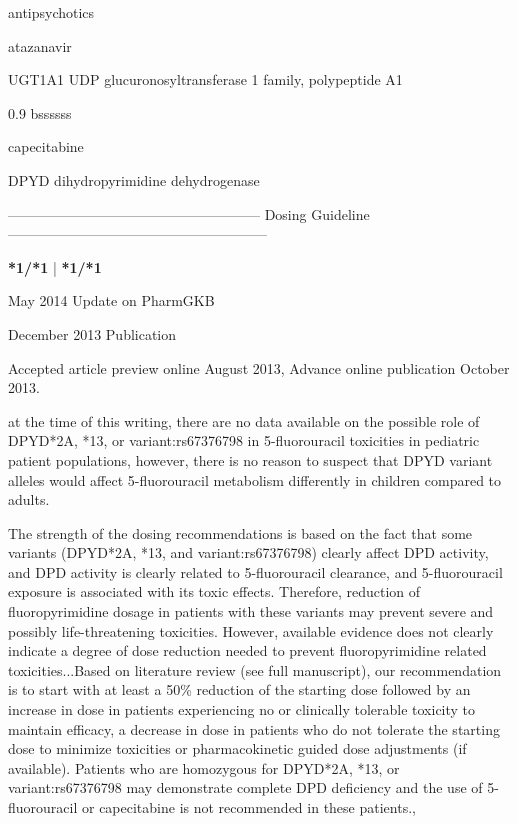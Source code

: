 \documentclass{resume} %
\begin{document}
\begin{rSection}{ antipsychotics }
\begin{rSection}{ atazanavir }
\begin{rSubsection}{ UGT1A1 }{ UDP glucuronosyltransferase 1 family, polypeptide A1 }{}{}
\begin{center}
\begin{tabularx}{0.9\textwidth}{ bssssss }
		\end{tabularx}
		\end{center}
		\normalsize
		\vspace{10pt}
		        
\begin{rSection}{ capecitabine }
\item[]
\begin{rSubsection}{ DPYD }{ dihydropyrimidine dehydrogenase }{}{}
\item[]
\item[] ------------------------------------------------------ Dosing Guideline --------------------------------------------------------\newline
\item[]
\item[] \textbf{ *1/*1 } | \textbf{ *1/*1 }
\item May 2014 Update on PharmGKB
 \newline
\item December 2013 Publication
 \newline
\item Accepted article preview online August 2013,  Advance online publication October 2013.
 \newline
\item at the time of this writing, there are no data available on the possible role of DPYD*2A, *13, or variant:rs67376798 in 5-fluorouracil toxicities in pediatric patient populations,  however, there is no reason to suspect that DPYD variant alleles would affect 5-fluorouracil metabolism differently in children compared to adults.
 \newline
\item The strength of the dosing recommendations is based on the fact that some variants (DPYD*2A, *13, and variant:rs67376798) clearly affect DPD activity, and DPD activity is clearly related to 5-fluorouracil clearance, and 5-fluorouracil exposure is associated with its toxic effects. Therefore, reduction of fluoropyrimidine dosage in patients with these variants may prevent severe and possibly life-threatening toxicities. However, available evidence does not clearly indicate a degree of dose reduction needed to prevent fluoropyrimidine related toxicities...Based on literature review (see full manuscript), our recommendation is to start with at least a 50\% reduction of the starting dose followed by an increase in dose in patients experiencing no or clinically tolerable toxicity to maintain efficacy, a decrease in dose in patients who do not tolerate the starting dose to minimize toxicities or pharmacokinetic guided dose adjustments (if available). Patients who are homozygous for DPYD*2A, *13, or variant:rs67376798 may demonstrate complete DPD deficiency and the use of 5-fluorouracil or capecitabine is not recommended in these patients.,  

\end{rSubsection}
\end{rSection}
\end{rSubsection}
\end{rSection}
\end{rSection}
\end{document}
